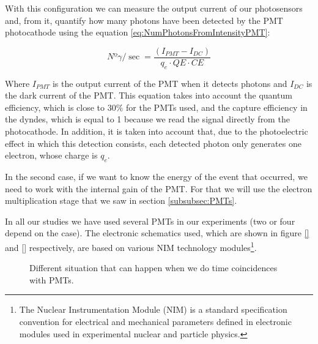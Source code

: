 With this configuration we can measure the output current of our photosensors and, from it, quantify how many photons have been detected by the PMT photocathode using the equation \ref{eq:NumPhotonsFromIntensityPMT}:

\begin{equation}
Nº\gamma/\sec = \frac{\left( I_{PMT} - I_{DC} \right)}{q_e \cdot{} QE \cdot{} CE}
\label{eq:NumPhotonsFromIntensityPMT}
\end{equation}

Where $I_{PMT}$ is the output current of the PMT when it detects photons and $I_{DC}$ is the dark current of the PMT. This equation takes into account the quantum efficiency, which is close to $30\%$ for the PMTs used, and the capture efficiency in the dyndes, which is equal to 1 because we read the signal directly from the photocathode. In addition, it is taken into account that, due to the photoelectric effect in which this detection consists, each detected photon only generates one electron, whose charge is $q_e$.

In the second case, if we want to know the energy of the event that occurred, we need to work with the internal gain of the PMT. For that we will use the electron multiplication stage that we saw in section \ref{subsubsec:PMTs}.

In all our studies we have used several PMTs in our experiments (two or four depend on the case). The electronic schematics used, which are shown in figure \ref{} and \ref{} respectively, are based on various NIM technology modules\footnote{The Nuclear Instrumentation Module (NIM) is a standard specification convention for electrical and mechanical parameters defined in electronic modules used in experimental nuclear and particle physics.}.

\begin{figure}[htbp]
 \centering
    \newline
 \caption{Different situation that can happen when we do time coincidences with PMTs.}
 \label{fig:DifferentCoincidences}
\end{figure}

